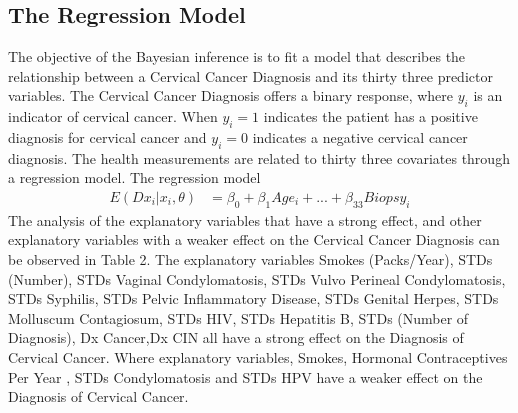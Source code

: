 \documentclass[12pt]{article}
\numberwithin{equation}{section}
\begin{document}
\subsection{The Regression Model} 
The objective of the Bayesian inference is to fit a model that describes the relationship between a Cervical Cancer Diagnosis and its thirty three predictor variables. The Cervical Cancer Diagnosis offers a binary response, where $y_i$ is an indicator of cervical cancer. When $y_i = 1$ indicates the patient has a positive diagnosis for cervical cancer and $y_i=0$ indicates a negative cervical cancer diagnosis. The health measurements are related to thirty three covariates through a regression model. The regression model
\begin{align}
E(Dx_i |x_i, \theta ) & = \beta_0 + \beta_1 Age_i + ... +  \beta_{33} Biopsy_i
\end{align}
The analysis of the explanatory variables that have a strong effect, and other explanatory variables with a weaker effect on the Cervical Cancer Diagnosis can be observed in Table 2. The explanatory variables Smokes (Packs/Year), STDs (Number), STDs Vaginal Condylomatosis, STDs Vulvo Perineal Condylomatosis, STDs Syphilis, STDs Pelvic Inflammatory Disease, STDs Genital Herpes, STDs Molluscum Contagiosum, STDs HIV, STDs Hepatitis B, STDs (Number of Diagnosis), Dx Cancer,Dx CIN all have a strong effect on the Diagnosis of Cervical Cancer. Where explanatory variables, Smokes, Hormonal Contraceptives Per Year , STDs Condylomatosis and STDs HPV have a weaker effect on the Diagnosis of Cervical Cancer. 
\end{document}
